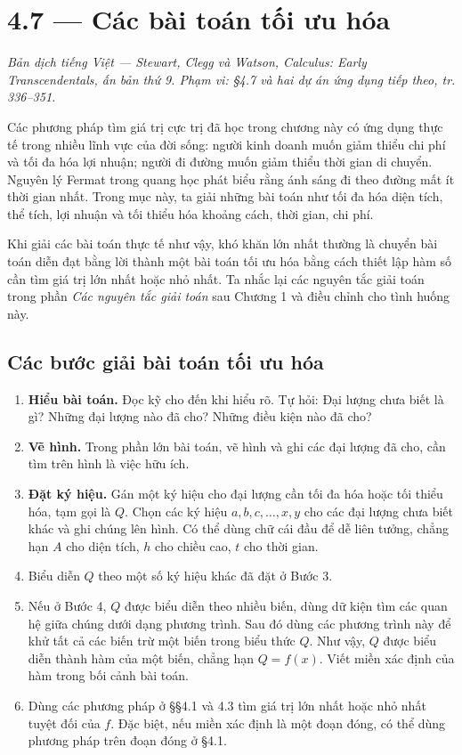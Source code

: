 \documentclass[12pt,a4paper]{article}
\begin{document}
\section*{4.7 — Các bài toán tối ưu hóa}
\noindent\textit{Bản dịch tiếng Việt — Stewart, Clegg và Watson, Calculus: Early Transcendentals, ấn bản thứ 9. Phạm vi: §4.7 và hai dự án ứng dụng tiếp theo, tr. 336–351.}

Các phương pháp tìm giá trị cực trị đã học trong chương này có ứng dụng thực tế trong nhiều lĩnh vực của đời sống: người kinh doanh muốn giảm thiểu chi phí và tối đa hóa lợi nhuận; người đi đường muốn giảm thiểu thời gian di chuyển. Nguyên lý Fermat trong quang học phát biểu rằng ánh sáng đi theo đường mất ít thời gian nhất. Trong mục này, ta giải những bài toán như tối đa hóa diện tích, thể tích, lợi nhuận và tối thiểu hóa khoảng cách, thời gian, chi phí.

Khi giải các bài toán thực tế như vậy, khó khăn lớn nhất thường là chuyển bài toán diễn đạt bằng lời thành một bài toán tối ưu hóa bằng cách thiết lập hàm số cần tìm giá trị lớn nhất hoặc nhỏ nhất. Ta nhắc lại các nguyên tắc giải toán trong phần \textit{Các nguyên tắc giải toán} sau Chương 1 và điều chỉnh cho tình huống này.
\subsection*{Các bước giải bài toán tối ưu hóa}
\begin{enumerate}[leftmargin=1.8em]
\item \textbf{Hiểu bài toán.} Đọc kỹ cho đến khi hiểu rõ. Tự hỏi: Đại lượng chưa biết là gì? Những đại lượng nào đã cho? Những điều kiện nào đã cho?
\item \textbf{Vẽ hình.} Trong phần lớn bài toán, vẽ hình và ghi các đại lượng đã cho, cần tìm trên hình là việc hữu ích.
\item \textbf{Đặt ký hiệu.} Gán một ký hiệu cho đại lượng cần tối đa hóa hoặc tối thiểu hóa, tạm gọi là $Q$. Chọn các ký hiệu $a,b,c,\ldots,x,y$ cho các đại lượng chưa biết khác và ghi chúng lên hình. Có thể dùng chữ cái đầu để dễ liên tưởng, chẳng hạn $A$ cho diện tích, $h$ cho chiều cao, $t$ cho thời gian.
\item Biểu diễn $Q$ theo một số ký hiệu khác đã đặt ở Bước 3.
\item Nếu ở Bước 4, $Q$ được biểu diễn theo nhiều biến, dùng dữ kiện tìm các quan hệ giữa chúng dưới dạng phương trình. Sau đó dùng các phương trình này để khử tất cả các biến trừ một biến trong biểu thức $Q$. Như vậy, $Q$ được biểu diễn thành hàm của một biến, chẳng hạn $Q=f(x)$. Viết miền xác định của hàm trong bối cảnh bài toán.
\item Dùng các phương pháp ở §§4.1 và 4.3 tìm giá trị lớn nhất hoặc nhỏ nhất tuyệt đối của $f$. Đặc biệt, nếu miền xác định là một đoạn đóng, có thể dùng phương pháp trên đoạn đóng ở §4.1.
\end{enumerate}
\end{document}
